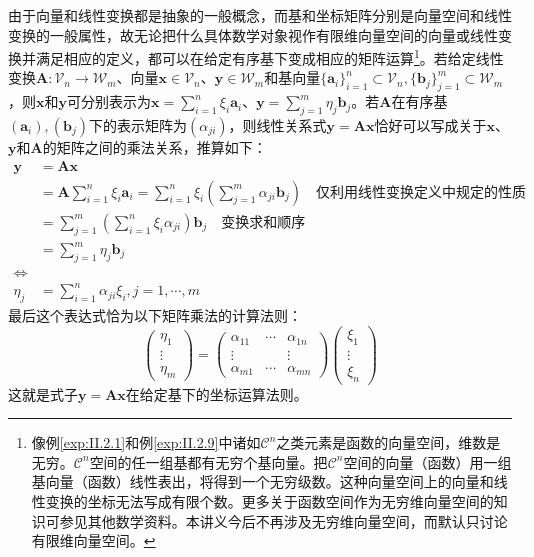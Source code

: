 \documentclass[main.tex]{subfiles}
\begin{document}
由于向量和线性变换都是抽象的一般概念，而基和坐标矩阵分别是向量空间和线性变换的一般属性，故无论把什么具体数学对象视作有限维向量空间的向量或线性变换并满足相应的定义，都可以在给定有序基下变成相应的矩阵运算\footnote{像例\ref{exp:II.2.1}和例\ref{exp:II.2.9}中诸如$\mathcal{C}^n$之类元素是函数的向量空间，维数是无穷。$\mathcal{C}^n$空间的任一组基都有无穷个基向量。把$\mathcal{C}^n$空间的向量（函数）用一组基向量（函数）线性表出，将得到一个无穷级数。这种向量空间上的向量和线性变换的坐标无法写成有限个数。更多关于函数空间作为无穷维向量空间的知识可参见其他数学资料\cite{Hassani1999}。本讲义今后不再涉及无穷维向量空间，而默认只讨论有限维向量空间。}。若给定线性变换$\mathbf{A}:\mathcal{V}_n\rightarrow\mathcal{W}_m$、向量$\mathbf{x}\in\mathcal{V}_n$、$\mathbf{y}\in\mathcal{W}_m$和基向量$\{\mathbf{a}_i\}_{i=1}^n\subset\mathcal{V}_n,\{\mathbf{b}_j\}_{j=1}^m\subset\mathcal{W}_m$，则$\mathbf{x}$和$\mathbf{y}$可分别表示为$\mathbf{x}=\sum_{i=1}^n\xi_i\mathbf{a}_i$、$\mathbf{y}=\sum_{j=1}^m\eta_j\mathbf{b}_j$。若$\mathbf{A}$在有序基$\left(\mathbf{a}_i\right),\left(\mathbf{b}_j\right)$下的表示矩阵为$\left(\alpha_{ji}\right)$，则线性关系式$\mathbf{y}=\mathbf{Ax}$恰好可以写成关于$\mathbf{x}$、$\mathbf{y}$和$\mathbf{A}$的矩阵之间的乘法关系，推算如下：
\begin{equation*}
    \begin{split}
        \mathbf{y}&=\mathbf{Ax}\\
        &=\mathbf{A}\sum_{i=1}^n\xi_i\mathbf{a}_i=\sum_{i=1}^n\xi_i\left(\sum_{j=1}^m\alpha_{ji}\mathbf{b}_j\right)\quad\text{仅利用线性变换定义中规定的性质}\\
        &=\sum_{j=1}^m\left(\sum_{i=1}^n\xi_i\alpha_{ji}\right)\mathbf{b}_j\quad\text{变换求和顺序}\\
        &=\sum_{j=1}^m\eta_j\mathbf{b}_j\\
        \Leftrightarrow\\
        \eta_j&=\sum_{i=1}^n\alpha_{ji}\xi_i,j=1,\cdots,m
    \end{split}
\end{equation*}
最后这个表达式恰为以下矩阵乘法的计算法则：
\[\left(\begin{array}{ccc}\eta_1\\\vdots\\\eta_m\end{array}\right)=\left(\begin{array}{ccc}\alpha_{11}&\cdots&\alpha_{1n}\\\vdots&&\vdots\\\alpha_{m1}&\cdots&\alpha_{mn}\end{array}\right)\left(\begin{array}{ccc}\xi_1\\\vdots\\\xi_n\end{array}\right)\]
这就是式子$\mathbf{y}=\mathbf{Ax}$在给定基下的坐标运算法则。
\end{document}

